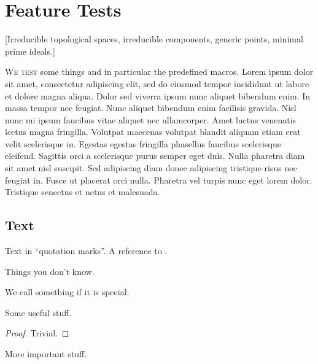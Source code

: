 \chapter{Feature Tests}

[Irreducible topological spaces, irreducible components, generic points, minimal prime ideals.]

\lettrine{W}{e test} some things and in particular the predefined macros.
Lorem ipsum dolor sit amet, consectetur adipiscing elit, sed do eiusmod tempor incididunt ut labore et dolore magna aliqua. Dolor sed viverra ipsum nunc aliquet bibendum enim. In massa tempor nec feugiat. Nunc aliquet bibendum enim facilisis gravida. Nisl nunc mi ipsum faucibus vitae aliquet nec ullamcorper. Amet luctus venenatis lectus magna fringilla. Volutpat maecenas volutpat blandit aliquam etiam erat velit scelerisque in. Egestas egestas fringilla phasellus faucibus scelerisque eleifend. Sagittis orci a scelerisque purus semper eget duis. Nulla pharetra diam sit amet nisl suscipit. Sed adipiscing diam donec adipiscing tristique risus nec feugiat in. Fusce ut placerat orci nulla. Pharetra vel turpis nunc eget lorem dolor. Tristique senectus et netus et malesuada.





\section{Text}

Text in \enquote{quotation marks}.
A reference to \cite{lee}.

\begin{recall}
	Things you don’t know.
\end{recall}

\begin{definition}
	We call something  if it is special.
\end{definition}

\begin{lemma}
	\label{generic lemma}
	Some useful stuff.
\end{lemma}

\begin{proof}
	Trivial.
\end{proof}

\begin{proposition}
	\label{generic proposition}
	More important stuff.
\end{proposition}

